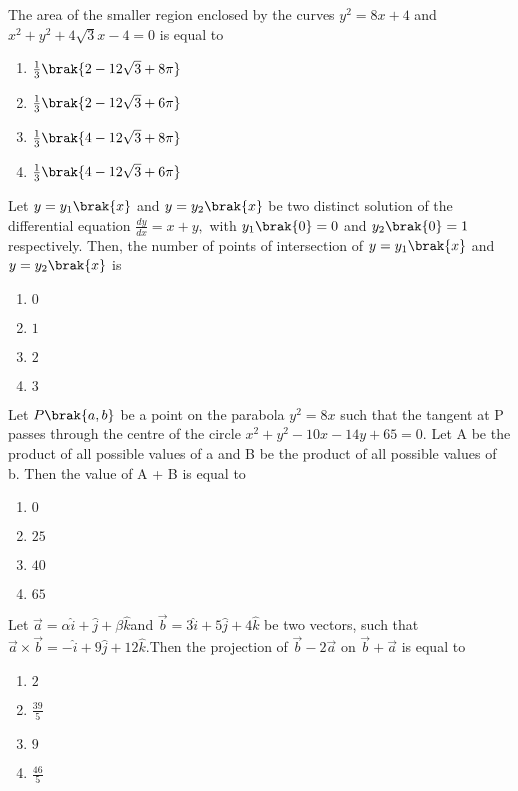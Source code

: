 \item The area of the smaller region enclosed by the curves $y^2=8x+4$ and $x^2 +y^2 + 4\sqrt{3}x-4 =0$ is equal to
\hfill{}
	\begin{enumerate}
    \item $ \frac{1}{3}\brak{2-12\sqrt{3} + 8\pi}$
    \item $ \frac{1}{3}\brak{2-12\sqrt{3} + 6\pi}$
    \item $ \frac{1}{3}\brak{4-12\sqrt{3} + 8\pi}$
    \item $ \frac{1}{3}\brak{4-12\sqrt{3} + 6\pi}$
\end{enumerate}
\item  Let $y=y_1\brak{x}$ and $y=y_2\brak{x}$ be two distinct solution of the differential equation $\frac{dy}{dx}=x+y,$ with $y_1\brak{0}=0$ and $y_2\brak{0}=1$  respectively. Then, the number of points of intersection of $y=y_1\brak{x}$ and $y=y_2\brak{x}$ is
\hfill{}
	\begin{enumerate}
    \item $0$
    \item $1$
    \item $2$
    \item $3$
\end{enumerate}
\item Let $P\brak{a,b}$  be a point on the parabola $y^2=8x$ such that the tangent at P passes through the centre of the circle $x^2+y^2-10x-14y+65=0$. Let A be the product of all possible values of a and B be the product of all possible values of b. Then the value of A + B is equal to
\hfill{}
	\begin{enumerate}
    \item $0$
    \item $25$
    \item $40$
    \item $65$
\end{enumerate}
\item Let $\vec{a} = \alpha \hat{i} + \hat{j} + \beta \hat{k} $and $ \vec{b} = 3 \hat{i} + 5\hat{j} + 4 \hat{k} $ be two vectors, such that $\vec{a} \times \vec{b} = -\hat{i} + 9\hat{j} + 12 \hat{k}. $Then the projection of $ \vec{b}-2\vec{a} $ on $ \vec{b}+ \vec{a}$ is equal to
\hfill{}
	\begin{enumerate}
    \item $2$
    \item $\frac{39}{5}$
    \item $9$
    \item $\frac{46}{5}$
\end{enumerate}
